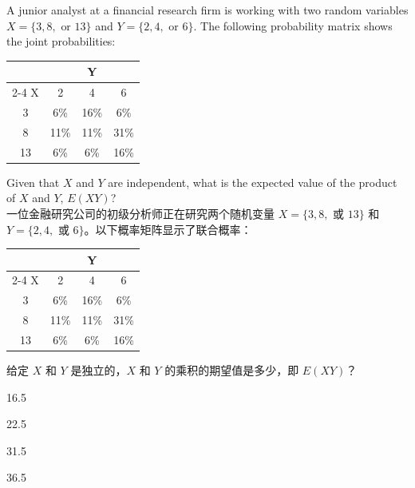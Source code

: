 \documentclass{article}
\newcounter{question} %
\begin{document}
\begin{question}
    A junior analyst at a financial research firm is working with two random variables \(X = \{3, 8, \text{ or } 13\}\) and \(Y=\{2, 4, \text{ or } 6\}\). The following probability matrix shows the joint probabilities:
    \begin{center}
        \begin{tabular}{|c|c|c|c|}
        \hline
        & \multicolumn{3}{|c|}{Y} \\
        \cline{2-4}
        X & 2 & 4 & 6 \\
        \hline
        3 & 6\% & 16\% & 6\% \\
        \hline
        8 & 11\% & 11\% & 31\% \\
        \hline
        13 & 6\% & 6\% & 16\% \\
        \hline
        \end{tabular}
    \end{center}
    Given that \(X\) and \(Y\) are independent, what is the expected value of the product of \(X\) and \(Y\), \(E(XY)\)?\\
    一位金融研究公司的初级分析师正在研究两个随机变量 \(X = \{3, 8, \text{ 或 } 13\}\) 和 \(Y=\{2, 4, \text{ 或 } 6\}\)。以下概率矩阵显示了联合概率：
    \begin{center}
        \begin{tabular}{|c|c|c|c|}
        \hline
        & \multicolumn{3}{|c|}{Y} \\
        \cline{2-4}
        X & 2 & 4 & 6 \\
        \hline
        3 & 6\% & 16\% & 6\% \\
        \hline
        8 & 11\% & 11\% & 31\% \\
        \hline
        13 & 6\% & 6\% & 16\% \\
        \hline
        \end{tabular}
    \end{center}
    给定 \(X\) 和 \(Y\) 是独立的，\(X\) 和 \(Y\) 的乘积的期望值是多少，即 \(E(XY)\)？\\
    \end{question}
    
    \begin{choices}
        \item 16.5
        \item 22.5
        \item 31.5
        \item 36.5
    \end{choices}
    
\end{document}
